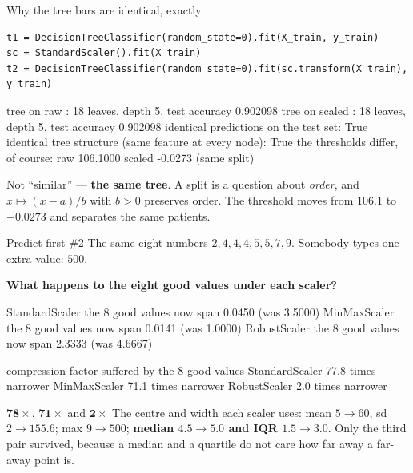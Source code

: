 \documentclass[aspectratio=169]{beamer}
\begin{document}
\begin{frame}[fragile,shrink=6]{Why the tree bars are identical, exactly}
\begin{lstlisting}
t1 = DecisionTreeClassifier(random_state=0).fit(X_train, y_train)
sc = StandardScaler().fit(X_train)
t2 = DecisionTreeClassifier(random_state=0).fit(sc.transform(X_train), y_train)
\end{lstlisting}
\begin{outblk}
tree on raw    : 18 leaves, depth 5, test accuracy 0.902098
tree on scaled : 18 leaves, depth 5, test accuracy 0.902098
identical predictions on the test set: True
identical tree structure (same feature at every node): True
the thresholds differ, of course: raw 106.1000  scaled -0.0273 (same split)
\end{outblk}
\begin{center}\small
  Not ``similar'' --- \textbf{the same tree}. A split is a question about
  \emph{order}, and $x \mapsto (x-a)/b$ with $b>0$ preserves order. The
  threshold moves from $106.1$ to $-0.0273$ and separates the same patients.
\end{center}
\end{frame}

\begin{frame}[fragile,shrink=8]{Predict first \#2}
The same eight numbers $2,4,4,4,5,5,7,9$. Somebody types one extra value:
$500$.

\begin{center}
  \textbf{What happens to the eight good values under each scaler?}
\end{center}
\vspace{0.2em}
\begin{outblk}
StandardScaler  the 8 good values now span 0.0450  (was 3.5000)
MinMaxScaler    the 8 good values now span 0.0141  (was 1.0000)
RobustScaler    the 8 good values now span 2.3333  (was 4.6667)

compression factor suffered by the 8 good values
  StandardScaler    77.8 times narrower
  MinMaxScaler      71.1 times narrower
  RobustScaler       2.0 times narrower
\end{outblk}
\begin{alertblock}{$\mathbf{78\times}$, $\mathbf{71\times}$ and $\mathbf{2\times}$}
  \footnotesize The centre and width each scaler uses:
  mean $5 \to 60$, sd $2 \to 155.6$; max $9 \to 500$;
  \textbf{median $4.5 \to 5.0$ and IQR $1.5 \to 3.0$}. Only the third pair
  survived, because a median and a quartile do not care how far away a
  far-away point is.
\end{alertblock}
\end{frame}
\end{document}
